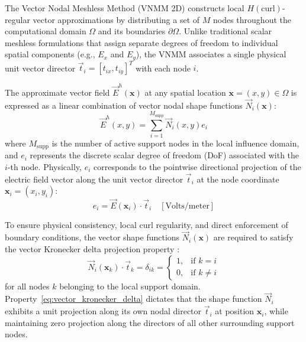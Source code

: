 \documentclass[preprint,12pt]{elsarticle}
\begin{document}
The Vector Nodal Meshless Method (VNMM 2D) \cite{ortiz2021nodal, ortiz2023tese} constructs local $H(\mathrm{curl})$-regular vector approximations by distributing a set of $M$ nodes throughout the computational domain $\Omega$ and its boundaries $\partial\Omega$. Unlike traditional scalar meshless formulations that assign separate degrees of freedom to individual spatial components (e.g., $E_x$ and $E_y$), the VNMM associates a single physical unit vector director $\vec{t}_i = [t_{ix}, t_{iy}]^T$ with each node $i$.

The approximate vector field $\vec{E}^h(\mathbf{x})$ at any spatial location $\mathbf{x} = (x, y) \in \Omega$ is expressed as a linear combination of vector nodal shape functions $\vec{N}_i(\mathbf{x})$:
\begin{equation}
\vec{E}^h(x, y) = \sum_{i=1}^{M_{\text{supp}}} \vec{N}_i(x, y) e_i
\label{eq:field_approx_vnmm}
\end{equation}
where $M_{\text{supp}}$ is the number of active support nodes in the local influence domain, and $e_i$ represents the discrete scalar degree of freedom (DoF) associated with the $i$-th node. Physically, $e_i$ corresponds to the pointwise directional projection of the electric field vector along the unit vector director $\vec{t}_i$ at the node coordinate $\mathbf{x}_i = (x_i, y_i)$:
\begin{equation}
e_i = \vec{E}(\mathbf{x}_i) \cdot \vec{t}_i \quad [\text{Volts/meter}]
\label{eq:dof_projection_definition}
\end{equation}

To ensure physical consistency, local curl regularity, and direct enforcement of boundary conditions, the vector shape functions $\vec{N}_i(\mathbf{x})$ are required to satisfy the vector Kronecker delta projection property \cite{lima2017edge, ortiz2021nodal}:
\begin{equation}
\vec{N}_i(\mathbf{x}_k) \cdot \vec{t}_k = \delta_{ik} = \begin{cases} 1, & \text{if } k = i \\ 0, & \text{if } k \neq i \end{cases}
\label{eq:vector_kronecker_delta}
\end{equation}
for all nodes $k$ belonging to the local support domain. Property~\eqref{eq:vector_kronecker_delta} dictates that the shape function $\vec{N}_i$ exhibits a unit projection along its own nodal director $\vec{t}_i$ at position $\mathbf{x}_i$, while maintaining zero projection along the directors of all other surrounding support nodes.
\end{document}
